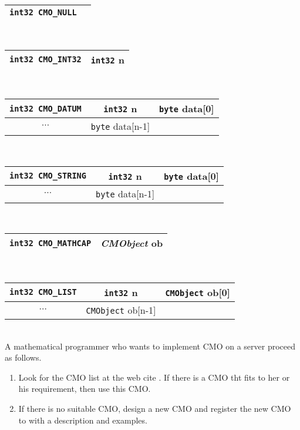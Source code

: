 \begin{tabular}{|c|c|}
\hline
{\tt int32 CMO\_NULL}  \\ 
\hline
\end{tabular} \\
\begin{tabular}{|c|c|}
\hline
{\tt int32 CMO\_INT32}& {\tt int32} {\rm n}  \\ 
\hline
\end{tabular} \\
\begin{tabular}{|c|c|c|}
\hline
{\tt int32 CMO\_DATUM}& {\tt int32} {\rm n} & {\tt byte} {\rm  data[0]} \\
\hline
$\cdots$ & {\tt byte} {\rm  data[n-1]} \\ 
\cline{1-2}
\end{tabular} \\
\begin{tabular}{|c|c|c|}
\hline
{\tt int32 CMO\_STRING}& {\tt int32} {\rm n} & {\tt byte} {\rm data[0]} \\
\hline
$\cdots$ & {\tt byte} {\rm data[n-1]} \\ 
\cline{1-2}
\end{tabular} \\
\begin{tabular}{|c|c|}
\hline
{\tt int32 CMO\_MATHCAP} & {\it CMObject} {\rm ob} \\ 
\hline
\end{tabular} \\
\begin{tabular}{|c|c|c|}
\hline
{\tt int32 CMO\_LIST}& {\tt int32} {\rm n} & {\tt CMObject} {\rm ob[0]} \\
\hline
$\cdots$ & {\tt CMObject} {\rm ob[n-1]} \\ 
\cline{1-2}
\end{tabular} \\


A mathematical programmer who wants to implement CMO on a server proceed 
as follows.
\begin{enumerate}
\item Look for the CMO list at the web cite \cite{openxm-web}.
If there is a CMO tht fits to her or his requirement, then use this CMO.     
\item If there is no suitable CMO, design a new CMO and register 
the new CMO to \cite{openxm-web} with a description and examples.
\end{enumerate}



